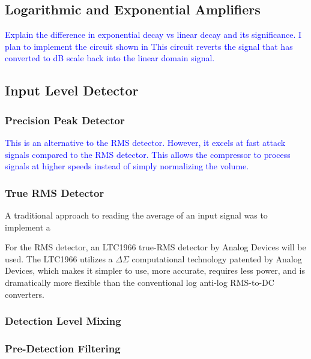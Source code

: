 \documentclass[10pt]{article}
\begin{document}
\begin{multicols*}{2}
            \subsection{Logarithmic and Exponential Amplifiers}
                \textcolor{blue}{Explain the difference in exponential decay vs linear decay and its significance. I plan to implement the circuit shown in \cite{ti-log-conv}}
                \textcolor{blue}{This circuit reverts the signal that has converted to dB scale back into the linear domain signal.}
            
            \subsection{Input Level Detector}

                \subsubsection{Precision Peak Detector}
                    \textcolor{blue}{This is an alternative to the RMS detector. However, it excels at fast attack signals compared to the RMS detector. This allows the compressor to process signals at higher speeds instead of simply normalizing the volume.}  

                \subsubsection{True RMS Detector}
                    A traditional approach to reading the average of an input signal was to implement a 
                    
                    For the RMS detector, an LTC1966 true-RMS detector by Analog Devices will be used. The LTC1966 utilizes a $\Delta\Sigma$ computational technology patented by Analog Devices, which makes it simpler to use, more accurate, requires less power, and is dramatically more flexible than the conventional log anti-log RMS-to-DC converters.                          
            
                \subsubsection{Detection Level Mixing}

                \subsubsection{Pre-Detection Filtering}


\end{multicols*}
\end{document}
